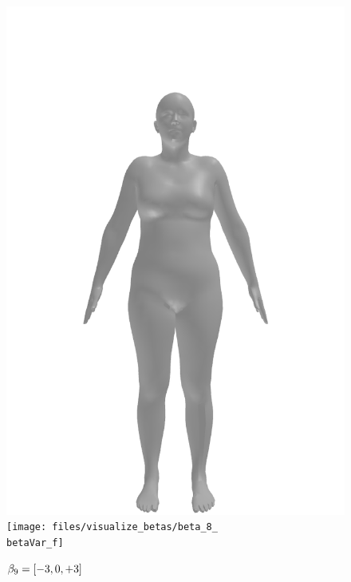 \begin{figure}[ht!]
\begin{minipage}[b]{\textwidth}
        \includegraphics[width=\imgWidth]{files/visualize_betas/baseline_f}
        \texttt{[image: files/visualize\_betas/beta\_8\_\\betaVar\_f]}
        \caption[Effect of varying $\beta_9$ in SMPL]{$\beta_9 = [-3, 0, +3]$}
    \end{minipage}
\end{figure}

